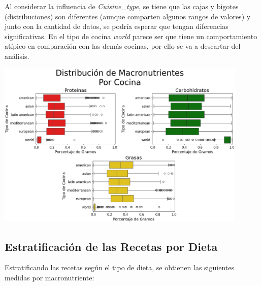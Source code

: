 \documentclass[12pt,a4paper]{article}
\begin{document}
{{            Al considerar la influencia de \emph{Cuisine\_type}, se tiene que las cajas y 
            bigotes (distribuciones) son diferentes (aunque comparten algunos rangos de valores) 
            y junto con la cantidad de datos, se podría esperar que tengan diferencias significativas. 
            En el tipo de cocina \emph{world} parece ser que tiene 
            un comportamiento atípico en comparación con las demás cocinas, por ello se va a 
            descartar del análisis.

            \begin{center}
                \includegraphics[width=0.9\textwidth]{Resources/EDA/VisionGeneral_2.png}
            \end{center}
        }

        \subsection{Estratificación de las Recetas por Dieta}
        {
            Estratificando las recetas según el tipo de dieta, se obtienen las siguientes 
            medidas por macronutriente:

}}
\end{document}
